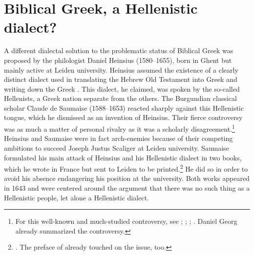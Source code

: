 \section{Biblical Greek, a Hellenistic dialect?}\label{sec:4.6}

A different dialectal solution to the problematic status of Biblical Greek was proposed by the philologist Daniel Heinsius (1580–1655), born in Ghent but mainly active at Leiden university. Heinsius assumed the existence of a clearly distinct dialect used in translating the Hebrew Old Testament into Greek and writing down the Greek . This dialect, he claimed, was spoken by the so-called Hellenists, a Greek nation separate from the others. The Burgundian classical scholar Claude de Saumaise (1588–1653) reacted sharply against this Hellenistic tongue, which he dismissed as an invention of Heinsius. Their fierce controversy was as much a matter of personal rivalry as it was a scholarly disagreement.\footnote{For this well-known and much-studied controversy, see \citet[32--34]{De1980}; \citet[391--392]{Muller1984}; \citet{Considine2010}; \citet[350--351]{VanHal2010a}. Daniel Georg \citet[\textsc{ii.}74–77]{Morhof1708} already summarized the controversy.} Heinsius and Saumaise were in fact arch-enemies because of their competing ambitions to succeed Joseph Justus Scaliger at Leiden university. Saumaise formulated his main attack of Heinsius and his Hellenistic dialect in two books, which he wrote in France but sent to Leiden to be printed.\footnote{\citet[]{Saumaise1643a, Saumaise1643}. The preface of \citet{Saumaise1639} already touched on the issue, too.} He did so in order to avoid his absence endangering his position at the university. Both works appeared in 1643 and were centered around the argument that there was no such thing as a Hellenistic people, let alone a Hellenistic dialect.

